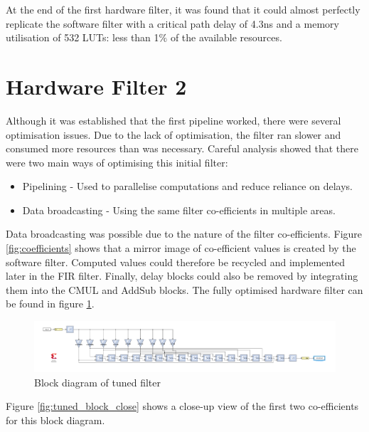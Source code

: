 \documentclass[12pt,a4paper]{article}
\begin{document}
At the end of the first hardware filter, it was found that it could almost perfectly replicate the software filter with a critical path delay of 4.3ns and a memory utilisation of 532 LUTs: less than 1$\%$ of the available resources.

\section{Hardware Filter 2}

Although it was established that the first pipeline worked, there were several optimisation issues. Due to the lack of optimisation, the filter ran slower and consumed more resources than was necessary. Careful analysis showed that there were two main ways of optimising this initial filter:

\begin{itemize}
    \item Pipelining - Used to parallelise computations and reduce reliance on delays.
    \item Data broadcasting - Using the same filter co-efficients in multiple areas.
\end{itemize}

Data broadcasting was possible due to the nature of the filter co-efficients. Figure \ref{fig:coefficients} shows that a mirror image of co-efficient values is created by the software filter. Computed values could therefore be recycled and implemented later in the FIR filter. Finally, delay blocks could also be removed by integrating them into the CMUL and AddSub blocks. The fully optimised hardware filter can be found in figure \ref{fig:tuned_block}.

\begin{figure}[H]
    \centering
    \includegraphics[scale=0.25]{images/tuned_block.PNG}
    \caption{Block diagram of tuned filter}
    \label{fig:tuned_block}
\end{figure}

Figure \ref{fig:tuned_block_close} shows a close-up view of the first two co-efficients for this block diagram.
\end{document}
